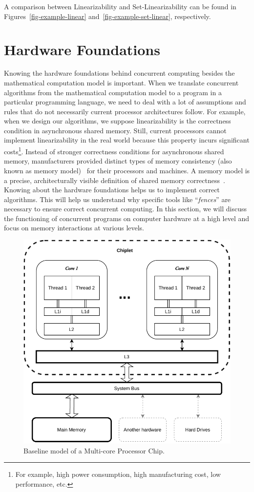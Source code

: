 A comparison between Linearizability and Set-Linearizability can be found in Figures~\ref{fig-example-linear} and~\ref{fig-example-set-linear}, respectively.

\section{\label{sec:hardware-foundations}Hardware Foundations}

Knowing the hardware foundations behind concurrent computing besides the mathematical computation model is important. When we translate concurrent algorithms from the mathematical computation model to a program in a particular programming language, we need to deal with a lot of assumptions and rules that do not necessarily current processor architectures follow. For example, when we design our algorithms, we suppose linearizability is the correctness condition in asynchronous shared memory. Still, current processors cannot implement linearizability in the real world because this property incurs significant costs\footnote{For example, high power consumption, high manufacturing cost, low performance, etc.}. Instead of stronger correctness conditions for asynchronous shared memory, manufacturers provided distinct types of memory consistency (also known as memory model)~\cite{DBLP_series_synthesis_2020Nagarajan, DBLP_series_synthesis_2013Scott} for their processors and machines. A memory model is a precise, architecturally visible definition of shared memory correctness~\cite{DBLP_series_synthesis_2020Nagarajan}. Knowing about the hardware foundations helps us to implement correct algorithms. This will help us understand why specific tools like ``\emph{fences}'' are necessary to ensure correct concurrent computing. In this section, we will discuss the functioning of concurrent programs on computer hardware at a high level and focus on memory interactions at various levels.

\begin{figure}[ht!]
    \centering
    \includegraphics[width=0.7\linewidth]{contents//figures/III_2_cpu.pdf}
    \caption{Baseline model of a Multi-core Processor Chip.}
    \label{fig:multi-core-processor}
\end{figure}

